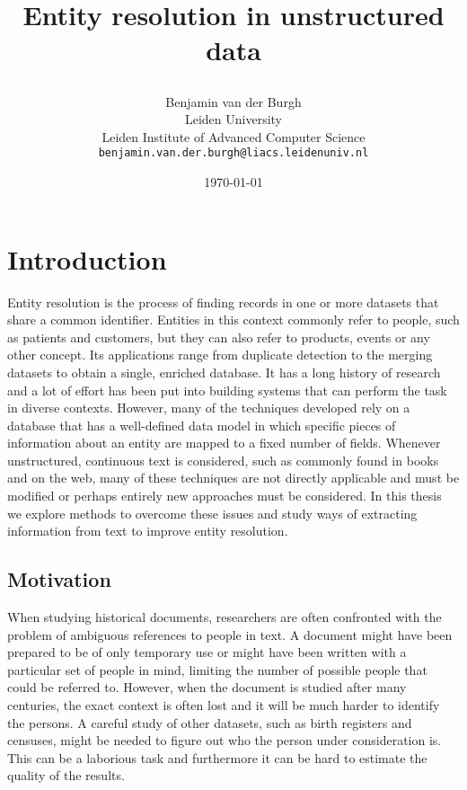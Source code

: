 \documentclass[paper=a4, fontsize=11pt]{scrartcl}
\title{ \vspace{-1in} 	\usefont{OT1}{bch}{b}{n}
		\huge \strut Entity resolution in unstructured data \strut
}
\author{
		\usefont{OT1}{bch}{m}{n} Benjamin van der Burgh\\
		\usefont{OT1}{bch}{m}{n} Leiden University\\
		\usefont{OT1}{bch}{m}{n} Leiden Institute of Advanced Computer Science\\
        \texttt{benjamin.van.der.burgh@liacs.leidenuniv.nl}
}
\date{\today}
\begin{document}
\maketitle




\section{Introduction}
\label{sec:introduction}

Entity resolution is the process of finding records in one or more datasets that share a common identifier.
Entities in this context commonly refer to people, such as patients and customers, but they can also refer to products, events or any other concept.
Its applications range from duplicate detection to the merging datasets to obtain a single, enriched database. It has a long history of research and a lot of effort has been put into building systems that can perform the task in diverse contexts.
However, many of the techniques developed rely on a database that has a well-defined data model in which specific pieces of information about an entity are mapped to a fixed number of fields.
Whenever unstructured, continuous text is considered, such as commonly found in books and on the web, many of these techniques are not directly applicable and must be modified or perhaps entirely new approaches must be considered.
In this thesis we explore methods to overcome these issues and study ways of extracting information from text to improve entity resolution.

\subsection{Motivation}
\label{sec:motivation}

When studying historical documents, researchers are often confronted with the problem of ambiguous references to people in text.
A document might have been prepared to be of only temporary use or might have been written with a particular set of people in mind, limiting the number of possible people that could be referred to.
However, when the document is studied after many centuries, the exact context is often lost and it will be much harder to identify the persons.
A careful study of other datasets, such as birth registers and censuses, might be needed to figure out who the person under consideration is.
This can be a laborious task and furthermore it can be hard to estimate the quality of the results.
\end{document}
